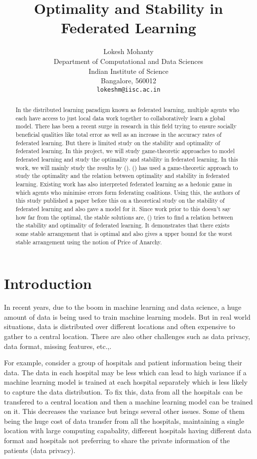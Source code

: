\documentclass{article}
\title{Optimality and Stability in Federated Learning}
\author{
  Lokesh Mohanty\\
  Department of Computational and Data Sciences\\
  Indian Institute of Science\\
  Bangalore, 560012 \\
  \texttt{lokeshm@iisc.ac.in} \\
}
\begin{document}
\maketitle

\begin{abstract}
In the distributed learning paradigm known as federated learning, multiple agents who each have access to just local data work together to collaboratively learn a global model.
There has been a recent surge in research in this field trying to ensure socially beneficial qualities like total error as well as an increase in the accuracy rates of federated learning.
But there is limited study on the stability and optimality of federated learning.
In this project, we will study game-theoretic approaches to model federated learning and study the optimality and stability in federated learning.
In this work, we will mainly study the results by (\cite{donahue2021opt}).
(\cite{donahue2021opt}) has used a game-theoretic approach to study the optimality and the relation between optimality and stability in federated learning. Existing work has also interpreted federated learning as a hedonic game in which agents who minimise errors form federating coalitions. Using this, the authors of this study published a paper before this on a theoretical study on the stability of federated learning and also gave a model for it.
Since work prior to this doesn't say how far from the optimal, the stable solutions are, (\cite{donahue2021opt}) tries to find a relation between the stability and optimality of federated learning. It demonstrates that there exists some stable arrangement that is optimal and also gives a upper bound for the worst stable arrangement using the notion of Price of Anarchy.
\end{abstract}

\section{Introduction}
In recent years, due to the boom in machine learning and data science, a huge amount of data is being used to train machine learning models.
But in real world situations, data is distributed over different locations and often expensive to gather to a central location. There are also other challenges such as data privacy, data format, missing features, etc.,.

For example, consider a group of hospitals and patient information being their data. The data in each hospital may be less which can lead to high variance if a machine learning model is trained at each hospital separately which is less likely to capture the data distribution. To fix this, data from all the hospitals can be transfered to a central location and then a machine learning model can be trained on it. This decreases the variance but brings several other issues. Some of them being the huge cost of data transfer from all the hospitals, maintaining a single location with large computing capabality, different hospitals having different data format and hospitals not preferring to share the private information of the patients (data privacy).
\end{document}
